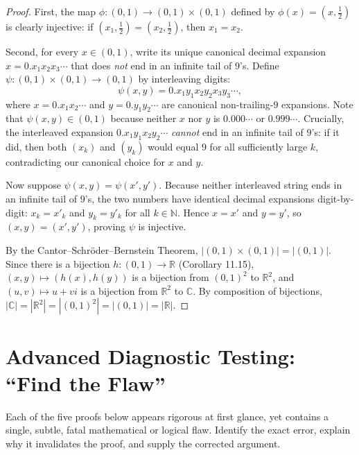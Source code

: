 \documentclass[11pt, letterpaper]{article}
\theoremstyle{definition}
\theoremstyle{remark}
\begin{document}
\begin{proof}
First, the map $\phi : (0, 1) \to (0, 1) \times (0, 1)$ defined by $\phi(x) = (x, \frac{1}{2})$ is clearly injective: if $(x_1, \frac{1}{2}) = (x_2, \frac{1}{2})$, then $x_1 = x_2$.

Second, for every $x \in (0, 1)$, write its unique canonical decimal expansion $x = 0.x_1 x_2 x_3 \cdots$ that does \emph{not} end in an infinite tail of $9$'s. Define $\psi : (0, 1) \times (0, 1) \to (0, 1)$ by interleaving digits:
\[
\psi(x, y) = 0.x_1 y_1 x_2 y_2 x_3 y_3 \cdots,
\]
where $x = 0.x_1 x_2 \cdots$ and $y = 0.y_1 y_2 \cdots$ are canonical non-trailing-$9$ expansions. Note that $\psi(x, y) \in (0, 1)$ because neither $x$ nor $y$ is $0.000\cdots$ or $0.999\cdots$. Crucially, the interleaved expansion $0.x_1 y_1 x_2 y_2 \cdots$ \emph{cannot} end in an infinite tail of $9$'s: if it did, then both $(x_k)$ and $(y_k)$ would equal $9$ for all sufficiently large $k$, contradicting our canonical choice for $x$ and $y$.

Now suppose $\psi(x, y) = \psi(x', y')$. Because neither interleaved string ends in an infinite tail of $9$'s, the two numbers have identical decimal expansions digit-by-digit: $x_k = x'_k$ and $y_k = y'_k$ for all $k \in \mathbb{N}$. Hence $x = x'$ and $y = y'$, so $(x, y) = (x', y')$, proving $\psi$ is injective.

By the Cantor--Schr\"oder--Bernstein Theorem, $|(0, 1) \times (0, 1)| = |(0, 1)|$. Since there is a bijection $h : (0, 1) \to \mathbb{R}$ (Corollary 11.15), $(x, y) \mapsto (h(x), h(y))$ is a bijection from $(0, 1)^2$ to $\mathbb{R}^2$, and $(u, v) \mapsto u + vi$ is a bijection from $\mathbb{R}^2$ to $\mathbb{C}$. By composition of bijections, $|\mathbb{C}| = |\mathbb{R}^2| = |(0, 1)^2| = |(0, 1)| = |\mathbb{R}|$.
\end{proof}

\section{Advanced Diagnostic Testing: ``Find the Flaw''}

Each of the five proofs below appears rigorous at first glance, yet contains a single, subtle, fatal mathematical or logical flaw. Identify the exact error, explain why it invalidates the proof, and supply the corrected argument.
\end{document}
